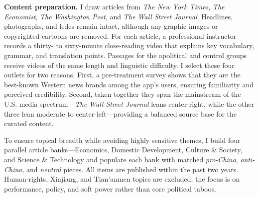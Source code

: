 \documentclass[12pt, american]{article}
\begin{document}
\textbf{Content preparation.} I draw articles from \textit{The New York Times}, \textit{The Economist}, \textit{The Washington Post}, and \textit{The Wall Street Journal}.  Headlines, photographs, and ledes remain intact, although any graphic images or copyrighted cartoons are removed.  For each article, a professional instructor records a thirty- to sixty-minute close-reading video that explains key vocabulary, grammar, and translation points.  Passages for the apolitical and control groups receive videos of the same length and linguistic difficulty.  I select these four outlets for two reasons.  First, a pre-treatment survey shows that they are the best-known Western news brands among the app’s users, ensuring familiarity and perceived credibility.  Second, taken together they span the mainstream of the U.S. media spectrum—\textit{The Wall Street Journal} leans center-right, while the other three lean moderate to center-left—providing a balanced source base for the curated content.



To ensure topical breadth while avoiding highly sensitive themes, I build four parallel article banks—Economics, Domestic Development, Culture \& Society, and Science \& Technology and populate each bank with matched \textit{pro-China}, \textit{anti-China}, and \textit{neutral} pieces.  All items are published within the past two years.  Human-rights, Xinjiang, and Tian’anmen topics are excluded; the focus is on performance, policy, and soft power rather than core political taboos.
\end{document}
